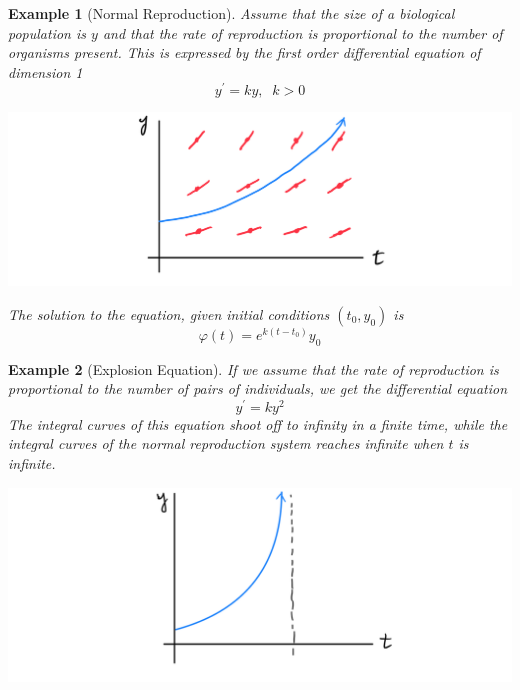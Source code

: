 \documentclass{article}
\newtheorem{example}{Example}[section]
\theoremstyle{remark}
\theoremstyle{definition}
\begin{document}
      \begin{example}[Normal Reproduction]
      Assume that the size of a biological population is $y$ and that the rate of reproduction is proportional to the number of organisms present. This is expressed by the first order differential equation of dimension 1 
      \[y^\prime = k y, \;\; k > 0\] 
      \begin{center}
          \includegraphics[scale=0.2]{img/Normal_Reproduction.PNG}
      \end{center}
      The solution to the equation, given initial conditions $(t_0, y_0)$ is 
      \[\varphi(t) = e^{k (t - t_0)} y_0\]
      \end{example}

      \begin{example}[Explosion Equation]
      If we assume that the rate of reproduction is proportional to the number of pairs of individuals, we get the differential equation 
      \[y^\prime = k y^2\]
      The integral curves of this equation shoot off to infinity in a finite time, while the integral curves of the normal reproduction system reaches infinite when $t$ is infinite. 
      \begin{center}
          \includegraphics[scale=0.25]{img/Explosion_Equation.PNG}
      \end{center}
      \end{example}
\end{document}
